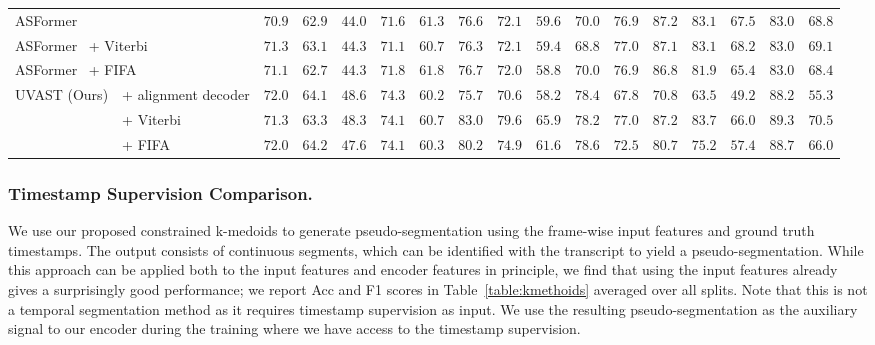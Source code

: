 \begin{table}[t!]
\begin{center}
{\begin{tabular}{ll|ccc|c|c||ccc|c|c||ccc|c|c}
\multicolumn{2}{l|}{ASFormer~\cite{asformer}} & $70.9$ & $62.9$ & $44.0$ & $71.6$ & $61.3$ & $76.6$ & $72.1$ & $59.6$ & $70.0$ & $76.9$ & $\mathbf{87.2}$ & $83.1$ & ${67.5}$ & $83.0$ & $68.8$ \\
\multicolumn{2}{l|}{ASFormer~\cite{asformer} + Viterbi} & $71.3$ & $63.1$ & $44.3$ & $71.1$ & $60.7$ & $76.3$ & $72.1$ & $59.4$ & $68.8$ & $\mathbf{77.0}$ & $87.1$ & $83.1$ & $\mathbf{68.2}$ & $83.0$ & $69.1$ \\
\multicolumn{2}{l|}{ASFormer~\cite{asformer} + FIFA} & $71.1$ & $62.7$ & $44.3$ & $71.8$ & $61.8$ & $76.7$ & $72.0$ & $58.8$ & $70.0$ & $76.9$ & $86.8$ & $81.9$ & $65.4$ & $83.0$ & $68.4$ \\
\hline 
\multirow{3}{*}{{UVAST (Ours)}}
 & + alignment decoder & $\mathbf{72.0}$ & $64.1$ & $\mathbf{48.6}$ & $\mathbf{74.3}$ & $60.2$ & $75.7$ & $70.6$ & $58.2$ & $78.4$ & $67.8$ & $70.8$ & $63.5$ & $49.2$ & $88.2$ & $55.3$\\
 & + Viterbi & $71.3$ & $63.3$ & $48.3$ & $74.1$ & $60.7$ & $\mathbf{83.0}$ & $\mathbf{79.6}$ & $\mathbf{65.9}$ & $78.2$ & $\mathbf{77.0}$ & $\mathbf{87.2}$ & $\mathbf{83.7}$ & $66.0$ & $\mathbf{89.3}$ & $\mathbf{70.5}$\\
 & + FIFA & $\mathbf{72.0}$ & $\mathbf{64.2}$ & $47.6$ & $74.1$ & $60.3$ & $80.2$ & $74.9$ & $61.6$ & $\mathbf{78.6}$ & $72.5$ & $80.7$ & $75.2$ & $57.4$ & $88.7$ & $66.0$\\
\hline 
\hline 
\end{tabular}    
}
\end{center}
\end{table}


\subsubsection{Timestamp Supervision Comparison.}
We use our proposed constrained k-medoids to generate pseudo-segmentation using the frame-wise input features and ground truth timestamps. The output consists of continuous segments, which can be identified with the transcript to yield a pseudo-segmentation. While this approach can be applied both to the input features and encoder features in principle, we find that using the input features already gives a surprisingly good performance; we report Acc and F1 scores in Table~\ref{table:kmethoids} averaged over all splits. Note that this is not a temporal segmentation method as it requires timestamp supervision as input. We use the resulting pseudo-segmentation as the auxiliary signal to our encoder during the training where we have access to the timestamp supervision. 

